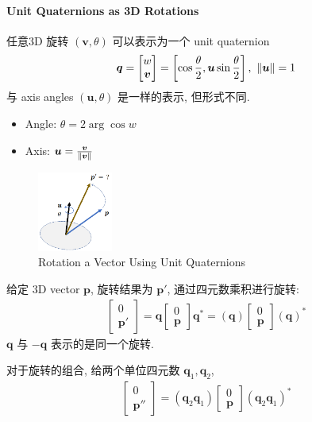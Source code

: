 \paragraph{Unit Quaternions as 3D Rotations} 任意3D 旋转 $(\bm v, \theta)$ 可以表示为一个 unit quaternion
\begin{align*}
    \bm q=\begin{bmatrix}
        w\\ \bm v
    \end{bmatrix}=\left[ \cos\frac{\theta}{2} ,  \bm u\sin\frac{\theta}{2} \right],\ \left\lVert\bm u\right\rVert=1
\end{align*}
与 axis angles $(\bm u, \theta)$ 是一样的表示, 但形式不同.
\begin{itemize}
    \item Angle: $\theta = 2\arg \cos w$
    \item Axis: $\bm u =\frac{\bm v}{\left\lVert\bm v\right\rVert}$
\end{itemize}

\begin{figure}[!htb]
    \centering
    \includegraphics[width=0.22\textwidth]{pic/1052/Rotation a Vector Using Unit Quaternions}
    \caption{Rotation a Vector Using Unit Quaternions}
\end{figure}

给定 3D vector $\bm p$, 旋转结果为 $\bm p'$, 通过四元数乘积进行旋转:
\begin{align*}
    \begin{bmatrix}
        0 \\ \bm p'
    \end{bmatrix}=\bm q \begin{bmatrix}
        0\\\bm p
    \end{bmatrix} \bm q^* = (\bm q) \begin{bmatrix}
        0\\\bm p
    \end{bmatrix} (\bm q)^* 
\end{align*}
$\bm q$ 与 $-\bm q$ 表示的是同一个旋转.

对于旋转的组合, 给两个单位四元数 $\bm q_1, \bm q_2$,
\begin{align*}
    \begin{bmatrix}
        0 \\ \bm p''
    \end{bmatrix}=(\bm q_2\bm q_1)\begin{bmatrix}
        0 \\ \bm p
    \end{bmatrix}(\bm q_2\bm q_1)^*
\end{align*}

